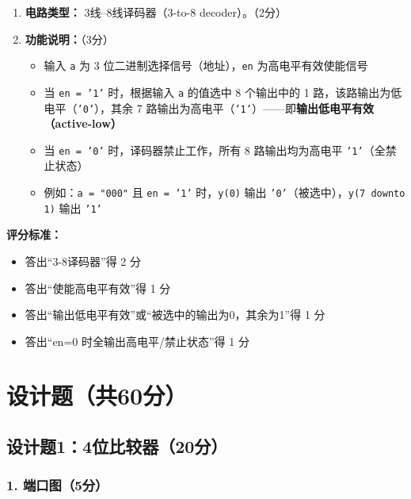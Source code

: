 \begin{enumerate}[label=(\arabic*),leftmargin=*]
\item \textbf{电路类型：} 3线--8线译码器（3-to-8 decoder）。（2分）

\item \textbf{功能说明：}（3分）
    \begin{itemize}
        \item 输入 \texttt{a} 为 3 位二进制选择信号（地址），\texttt{en} 为高电平有效使能信号
        \item 当 \texttt{en = '1'} 时，根据输入 \texttt{a} 的值选中 8 个输出中的 1 路，该路输出为低电平（\texttt{'0'}），其余 7 路输出为高电平（\texttt{'1'}）——即\textbf{输出低电平有效（active-low）}
        \item 当 \texttt{en = '0'} 时，译码器禁止工作，所有 8 路输出均为高电平 \texttt{'1'}（全禁止状态）
        \item 例如：\texttt{a = "000"} 且 \texttt{en = '1'} 时，\texttt{y(0)} 输出 \texttt{'0'}（被选中），\texttt{y(7 downto 1)} 输出 \texttt{'1'}
    \end{itemize}
\end{enumerate}

\textbf{评分标准：}
\begin{itemize}
    \item 答出“3-8译码器”得 2 分
    \item 答出“使能高电平有效”得 1 分
    \item 答出“输出低电平有效”或“被选中的输出为0，其余为1”得 1 分
    \item 答出“en=0 时全输出高电平/禁止状态”得 1 分
\end{itemize}

\section{设计题（共60分）}

\subsection{设计题1：4位比较器（20分）}

\subsubsection*{1. 端口图（5分）}

